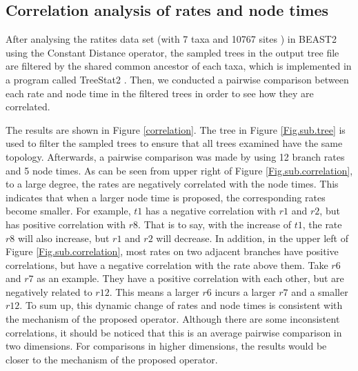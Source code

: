 \documentclass{bmcart}
\begin{document}

\subsection*{Correlation analysis of rates and node times}
After analysing the ratites data set (with 7 taxa and 10767 sites \cite{cooper2001complete}) in BEAST2 using the Constant Distance operator, the sampled trees in the output tree file are filtered by the shared common ancestor of each taxa, which is implemented in a program called TreeStat2 \cite{TreeStat2}. Then, we conducted a pairwise comparison between each rate and node time in the filtered trees in order to see how they are correlated.

The results are shown in Figure \ref{correlation}. The tree in Figure \ref{Fig.sub.tree} is used to filter the sampled trees to ensure that all trees examined have the same topology. Afterwards, a pairwise comparison was made by using 12 branch rates and 5 node times. As can be seen from upper right of Figure \ref{Fig.sub.correlation}, to a large degree, the rates are negatively correlated with the node times. This indicates that when a larger node time is proposed, the corresponding rates become smaller. For example, $t1$ has a negative correlation with $r1$ and $r2$, but has positive correlation with $r8$. That is to say, with the increase of $t1$, the rate $r8$ will also increase, but $r1$ and $r2$ will decrease. In addition, in the upper left of Figure \ref{Fig.sub.correlation}, most rates on two adjacent branches have positive correlations, but have a negative correlation with the rate above them. Take $r6$ and $r7$ as an example. They have a positive correlation with each other, but are negatively related to $r12$. This means a larger $r6$ incurs a larger $r7$ and a smaller $r12$. To sum up, this dynamic change of rates and node times is consistent with the mechanism of the proposed operator. Although there are some inconsistent correlations, it should be noticed that this is an average pairwise comparison in two dimensions. For comparisons in higher dimensions, the results would be closer to the mechanism of the proposed operator.
\end{document}
